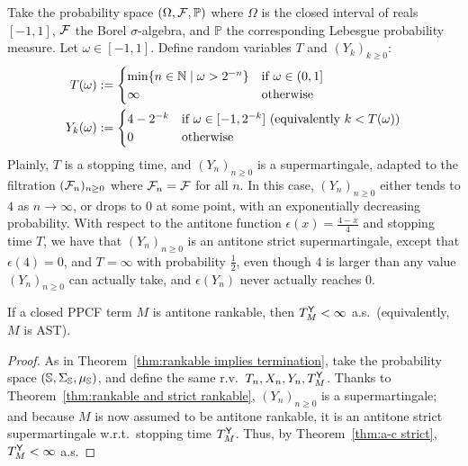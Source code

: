 \begin{example}
Take the probability space $(\Omega, \mathcal{F}, \mathbb{P})$ where $\Omega$ is the closed interval of reals $[-1, 1]$, $\mathcal{F}$ the Borel $\sigma$-algebra, and $\mathbb{P}$ the corresponding Lebesgue probability measure.
Let $\omega \in [-1, 1]$. Define random variables $T$ and $(Y_k)_{k \geq 0}$:
\begin{align*}
T(\omega) & := 
\begin{cases}
\min\{n \in \mathbb{N} \mid \omega > 2^{-n}\} & \hbox{if $\omega \in (0, 1]$}\\
\infty & \hbox{otherwise}
\end{cases} 
\\
Y_k(\omega) & := 
\begin{cases}
4-2^{-k} & \hbox{if $\omega \in [-1, 2^{-k}]$ (equivalently $k < T(\omega)$)}\\
0 & \hbox{otherwise}
\end{cases} 
\end{align*}
Plainly, $T$ is a stopping time, and $(Y_n)_{n \geq 0}$ is a supermartingale, adapted to the filtration $(\mathcal{F}_n)_{n \geq 0}$ where $\mathcal{F}_n = \mathcal{F}$ for all $n$. 
In this case, $(Y_n)_{n \geq 0}$ either tends to $4$ as $n \to \infty$, or drops to 0 at some point, with an exponentially decreasing probability. 
With respect to the antitone function $\epsilon(x) = \frac{4-x}{4}$ and stopping time $T$, we have that $(Y_n)_{n \geq 0}$ is an antitone strict supermartingale, except that $\epsilon(4) = 0$, and $T = \infty$ with probability $\frac 1 2$, even though $4$ is larger than any value $(Y_n)_{n \geq 0}$ can actually take, and $\epsilon(Y_n)$ never actually reaches $0$.
\end{example}


\begin{therm} \label{thm:antitone rankable implies termination}
If a closed PPCF term $M$ is antitone rankable, then $T_M^{\mathsf{Y}} < \infty$ a.s.~(equivalently, $M$ is AST).
\end{therm}
\begin{proof}
As in %
Theorem~\ref{thm:rankable implies termination},
take the probability space $({\mathbb{S}}, \Sigma_{\mathbb{S}}, \mu_{\mathbb{S}})$, and define the same r.v.~$T_n, X_n, Y_n, T_M^{\mathsf{Y}}$. 
Thanks to Theorem~\ref{thm:rankable and strict rankable}, $(Y_n)_{n \geq 0}$ is a supermartingale; and because $M$ is now assumed to be antitone rankable, it is an antitone strict supermartingale w.r.t.~stopping time $T_M^{\mathsf{Y}}$. 
Thus, by Theorem~\ref{thm:a-c strict}, $T_M^{\mathsf{Y}} < \infty$ a.s.
\end{proof}

